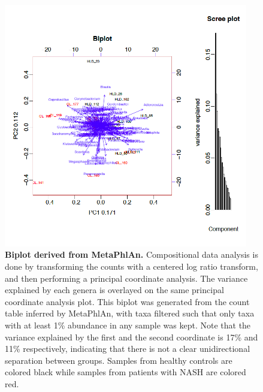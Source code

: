 \begin{figure}[h]
\begin{center}
\includegraphics[width=0.95\textwidth]{metaphlan_biplot.png}
\caption[Biplot derived from MetaPhlAn.]{\textbf{Biplot derived from MetaPhlAn.} Compositional data analysis is done by transforming the counts with a centered log ratio transform, and then performing a principal coordinate analysis. The variance explained by each genera is overlayed on the same principal coordinate analysis plot. This biplot was generated from the count table inferred by MetaPhlAn, with taxa filtered such that only taxa with at least 1\% abundance in any sample was kept. Note that the variance explained by the first and the second coordinate is 17\% and 11\% respectively, indicating that there is not a clear unidirectional separation between groups. Samples from healthy controls are colored black while samples from patients with NASH are colored red.}
\end{center}
\label{nafld_metaphlan_biplot}
\end{figure}

